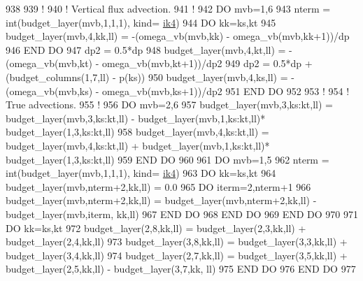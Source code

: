 \begin{DoxyCode}
938 
939     \textcolor{comment}{!}
940     \textcolor{comment}{! Vertical flux advection.}
941     \textcolor{comment}{!}
942     \textcolor{keywordflow}{DO} mvb=1,6
943         nterm                               = int(budget\_layer(mvb,1,1,1), kind=
      \hyperlink{namespaceportable_aa110cf333432508140602ea192c4b2ea}{ik4})
944         \textcolor{keywordflow}{DO} kk=ks,kt
945             budget\_layer(mvb,4,kk,ll)       = -(omega\_vb(mvb,kk) - omega\_vb(mvb,kk+1))/dp
946 \textcolor{keywordflow}{        END DO}
947         dp2                                 = 0.5*dp
948         budget\_layer(mvb,4,kt,ll)           = -(omega\_vb(mvb,kt) - omega\_vb(mvb,kt+1))/dp2
949         dp2                                 = 0.5*dp + (budget\_columns(1,7,ll) - p(ks))
950         budget\_layer(mvb,4,ks,ll)           = -(omega\_vb(mvb,ks) - omega\_vb(mvb,ks+1))/dp2
951 \textcolor{keywordflow}{    END DO}
952 
953     \textcolor{comment}{!}
954     \textcolor{comment}{! True advections.}
955     \textcolor{comment}{!}
956     \textcolor{keywordflow}{DO} mvb=2,6
957         budget\_layer(mvb,3,ks:kt,ll)    = budget\_layer(mvb,3,ks:kt,ll) - budget\_layer(mvb,1,ks:kt,ll)*
      budget\_layer(1,3,ks:kt,ll)
958         budget\_layer(mvb,4,ks:kt,ll)    = budget\_layer(mvb,4,ks:kt,ll) + budget\_layer(mvb,1,ks:kt,ll)*
      budget\_layer(1,3,ks:kt,ll)
959 \textcolor{keywordflow}{    END DO}
960 
961     \textcolor{keywordflow}{DO} mvb=1,5
962         nterm                               = int(budget\_layer(mvb,1,1,1), kind=
      \hyperlink{namespaceportable_aa110cf333432508140602ea192c4b2ea}{ik4})
963         \textcolor{keywordflow}{DO} kk=ks,kt
964             budget\_layer(mvb,nterm+2,kk,ll) = 0.0
965             \textcolor{keywordflow}{DO} iterm=2,nterm+1
966                 budget\_layer(mvb,nterm+2,kk,ll) = budget\_layer(mvb,nterm+2,kk,ll) - budget\_layer(mvb,iterm,
      kk,ll)
967 \textcolor{keywordflow}{            END DO}
968 \textcolor{keywordflow}{        END DO}
969 \textcolor{keywordflow}{    END DO}
970 
971     \textcolor{keywordflow}{DO} kk=ks,kt
972         budget\_layer(2,8,kk,ll) = budget\_layer(2,3,kk,ll) + budget\_layer(2,4,kk,ll)
973         budget\_layer(3,8,kk,ll) = budget\_layer(3,3,kk,ll) + budget\_layer(3,4,kk,ll)
974         budget\_layer(2,7,kk,ll) = budget\_layer(3,5,kk,ll) + budget\_layer(2,5,kk,ll) - budget\_layer(3,7,kk,
      ll)
975 \textcolor{keywordflow}{    END DO}
976 \textcolor{keywordflow}{END DO}
977 
\end{DoxyCode}


